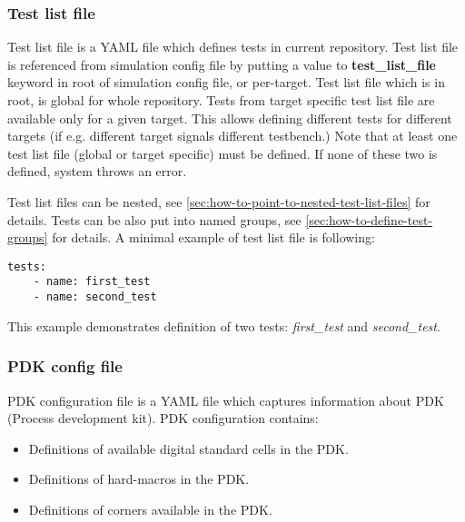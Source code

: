 \documentclass{tropic_design_spec}
\begin{document}
\subsubsection{Test list file}
\label{sec:test-list-file}

Test list file is a YAML file which defines tests in current repository.
Test list file is referenced from simulation config file by putting a value to
\textbf{test_list_file} keyword in root of simulation config file, or per-target. Test
list file which is in root, is global for whole repository. Tests from target specific
test list file are available only for a given target. This allows defining different
tests for different targets (if e.g. different target signals different testbench.)
Note that at least one test list file (global or target specific) must be defined.
If none of these two is defined, system throws an error.

Test list files can be nested, see \ref{sec:how-to-point-to-nested-test-list-files}
for details. Tests can be also put into named groups, see
\ref{sec:how-to-define-test-groups} for details. A minimal example of test list file
is following:

\begin{lstlisting}
tests:
    - name: first_test
    - name: second_test
\end{lstlisting}

This example demonstrates definition of two tests: \textit{first_test} and
\textit{second_test}.



\subsubsection{PDK config file}
\label{sec:pdk-config-file}

PDK configuration file is a YAML file which captures information about PDK (Process
development kit). PDK configuration contains:
\begin{itemize}
    \item Definitions of available digital standard cells in the PDK.
    \item Definitions of hard-macros in the PDK.
    \item Definitions of corners available in the PDK.
\end{itemize}
\end{document}

